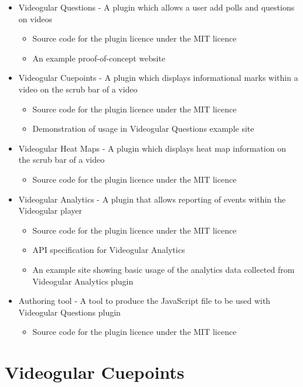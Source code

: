 \documentclass[12pt,a4paper]{article}
\begin{document}
\begin{itemize}
\item Videogular Questions - A plugin which allows a user add polls and questions on videos
	\begin{itemize}
	\item Source code for the plugin licence under the MIT licence
	\item An example proof-of-concept website
	\end{itemize}
	
\item Videogular Cuepoints - A plugin which displays informational marks within a video on the scrub bar of a video
	\begin{itemize}
	\item Source code for the plugin licence under the MIT licence
	\item Demonstration of usage in Videogular Questions example site
	\end{itemize}
	
\item Videogular Heat Maps - A plugin which displays heat map information on the scrub bar of a video
	\begin{itemize}
	\item Source code for the plugin licence under the MIT licence
	\end{itemize}
	
\item Videogular Analytics - A plugin that allows reporting of events within the Videogular player
	\begin{itemize}
	\item Source code for the plugin licence under the MIT licence
	\item API specification for Videogular Analytics
	\item An example site showing basic usage of the analytics data collected from Videogular Analytics plugin
	\end{itemize}
	
\item Authoring tool - A tool to produce the JavaScript file to be used with Videogular Questions plugin
	\begin{itemize}
	\item Source code for the plugin licence under the MIT licence
	\end{itemize}
\end{itemize}

\section*{Videogular Cuepoints}
\end{document}

